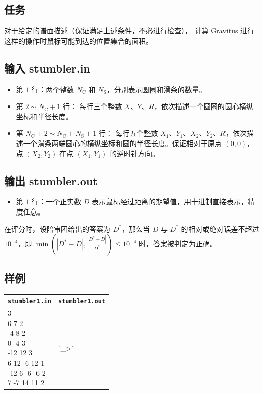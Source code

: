 \documentclass[UTF8, 11pt, a4paper]{article}
\begin{document}
\subsection*{任务}
对于给定的谱面描述（保证满足上述条件，不必进行检查），%
计算 Gravitus 进行这样的操作时鼠标可能到达的位置集合的面积。

\subsection*{输入 \makebox[0.5em]{} \small{stumbler.in}}
\begin{itemize}
    \item 第 $1$ 行：两个整数 $N_\mathrm{C}$ 和 $N_\mathrm{S}$，分别表示圆圈和滑条的数量。
    \item 第 $2 \sim N_\mathrm{C} + 1$ 行：%
        每行三个整数 $X$、$Y$、$R$，依次描述一个圆圈的圆心横纵坐标和半径长度。
    \item 第 $N_\mathrm{C} + 2 \sim N_\mathrm{C} + N_\mathrm{S} + 1$ 行：%
        每行五个整数 $X_1$、$Y_1$、$X_2$、$Y_2$、$R$，依次描述一个滑条两端圆心的横纵坐标和圆的半径长度。保证相对于原点 $(0, 0)$，点 $(X_2, Y_2)$ 在点 $(X_1, Y_1)$ 的逆时针方向。
\end{itemize}

\subsection*{输出 \makebox[0.5em]{} \small{stumbler.out}}
\begin{itemize}
    \item 第 $1$ 行：一个正实数 $D$ 表示鼠标经过距离的期望值，用十进制直接表示，精度任意。
\end{itemize}

在评分时，设陪审团给出的答案为 $D^*$，那么当 $D$ 与 $D^*$ 的相对或绝对误差不超过 %
$10^{-4}$，即 $\min\left(|D^* - D|, \frac{|D^* - D|}{D^*}\right) \leq 10^{-4}$ 时，答案被判定为正确。

\subsection*{样例}
\begin{table}[h]\centering
\begin{tabularx}{0.8 \textwidth}{|X|X|}
\hline
\texttt{\textbf{stumbler1.in}} & \texttt{\textbf{stumbler1.out}} \\ \hline
{\ttfamily
4 3\newline
6 7 2\newline
-4 8 2\newline
0 -4 3\newline
-12 12 3\newline
6 12 -6 12 1\newline
-12 6 -6 -6 2\newline
7 -7 14 11 2
} & {\ttfamily
ˊ\_>ˋ
}
\\ \hline
\end{tabularx}\end{table}
\end{document}
